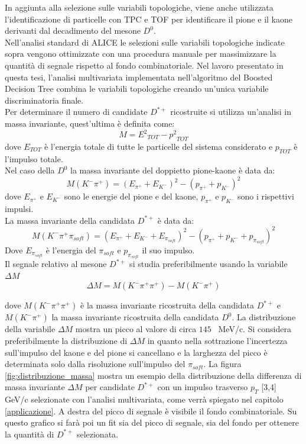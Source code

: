 In aggiunta alla selezione sulle variabili topologiche, viene anche utilizzata l'identificazione di particelle con TPC e TOF per identificare il pione e il kaone derivanti dal decadimento del mesone $D^0$.
\\Nell'analisi standard di ALICE le selezioni sulle variabili topologiche indicate sopra vengono ottimizzate con una procedura manuale per massimizzare la quantit\`a di segnale rispetto al fondo combinatoriale. Nel lavoro presentato in questa tesi, l'analisi multivariata implementata nell'algoritmo del Boosted Decision Tree combina le variabili topologiche creando un'unica variabile discriminatoria finale.
\\Per determinare il numero di candidate $D^{*+}$ ricostruite  si utilizza un'analisi in massa invariante, quest'ultima \`e definita come: 
    \begin{equation}
        M = {E^2}_{TOT} - {p^2}_{TOT}
    \end{equation}
dove $E_{TOT}$ \`e l'energia totale di tutte le particelle del sistema considerato e $p_{TOT}$ \`e l'impulso totale. 
\\Nel caso della $D^0$ la massa invariante del doppietto pione-kaone \`e data da:  
    \begin{equation}
        M(K^- \pi^+) = ({E_{\pi^+}+E_{K^-}})^2 - ({p_{\pi^+}+p_{K^-}})^2
    \end{equation}
dove $E_{\pi^+}$ e $E_{K^-}$ sono le energie del pione e del kaone, $p_{\pi^+}$ e $p_{K^-}$ sono i rispettivi impulsi.
\\La massa invariante della candidata $D^{*+}$ \`e data da:
    \begin{equation}
        M(K^- \pi^+ \pi_{soft}) = ({E_{\pi^+}+E_{K^-}+E_{\pi_{soft}}})^2 - ({p_{\pi^+}+p_{K^-}+p_{\pi_{soft}}})^2
    \end{equation}
Dove $E_{\pi_{soft}}$ \`e l'energia del $\pi_{soft}$ e $p_{\pi_{soft}}$ il suo impulso.
\\Il segnale relativo al mesone $D^{*+}$ si studia preferibilmente usando la variabile $\Delta M$
  \begin{equation}
       \Delta M = M (K^- \pi^+ \pi^+) - M(K^- \pi^+)
    \end{equation}
    
dove $ M (K^- \pi^+ \pi^+)$ \`e la massa invariante ricostruita della candidata $D^{*+}$ e $ M(K^- \pi^+)$ la massa invariante ricostruita della candidata $D^{0}$. La distribuzione della variabile $\Delta M$ mostra un picco al valore di circa $145$~ MeV/c. Si considera preferibilmente la distribuzione di $\Delta M$ in quanto nella sottrazione l'incertezza sull'impulso del kaone e del pione si cancellano e la larghezza del picco \`e determinata solo dalla risoluzione sull'impulso del $\pi_{soft}$. La figura \ref{fig:distribuzione_massa} mostra un esempio della distribuzione della differenza di massa invariante $\Delta M$ per candidate $D^{*+}$ con un impulso trasverso $p_T$ [3,4] GeV/c selezionate con l'analisi multivariata, come verr\`a spiegato nel capitolo \ref{applicazione}. A destra del picco di segnale \`e visibile il fondo combinatoriale. Su questo grafico si far\`a poi un fit sia del picco di segnale, sia del fondo per ottenere la quantit\`a di $D^{*+}$ selezionata. 

